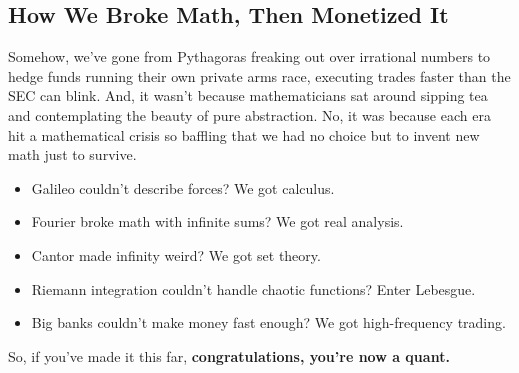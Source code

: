 \subsection{How We Broke Math, Then Monetized It}

Somehow, we've gone from Pythagoras freaking out over irrational numbers to hedge funds running their own private arms race, executing trades faster than the SEC can blink. And, it wasn’t because mathematicians sat around sipping tea and contemplating the beauty of pure abstraction. No, it was because each era hit a mathematical crisis so baffling that we had no choice but to invent new math just to survive.

\begin{itemize}
    \item Galileo couldn't describe forces? We got calculus.
    \item Fourier broke math with infinite sums? We got real analysis.
    \item Cantor made infinity weird? We got set theory.
    \item Riemann integration couldn't handle chaotic functions? Enter Lebesgue.
    \item Big banks couldn't make money fast enough? We got high-frequency trading.
\end{itemize}

So, if you've made it this far, \textbf{congratulations, you’re now a quant.}

